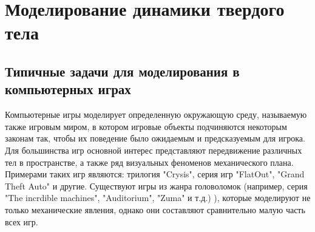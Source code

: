 \chapter{Моделирование динамики твердого тела}
\section{Типичные задачи для моделирования в компьютерных играх}

Компьютерные игры моделирует определенную окружающую среду,
называемую также игровым миром, в котором игровые объекты подчиняются
некоторым законам так, чтобы их поведение было ожидаемым и предсказуемым
для игрока. Для большинства игр основной интерес представляют передвижение
различных тел в пространстве, а также ряд визуальных феноменов механического
плана. Примерами таких игр являются: трилогия "Crysis", серия игр "FlatOut", "Grand Theft Auto" и другие.
Существуют игры из жанра головоломок (например, серия "The incrdible machines", "Auditorium", "Zuma" и т.д.)
), которые моделируют не только механические явления, однако они составляют
сравнительно малую часть всех игр.



